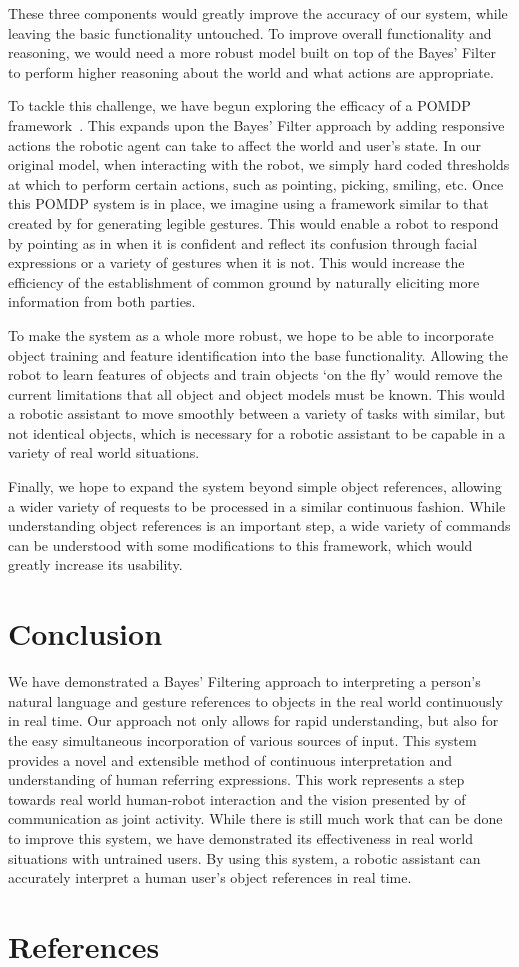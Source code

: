 \documentclass[a4paper, 11pt]{article} %
\begin{document}
These three components would greatly improve the accuracy of our system, while leaving the basic functionality untouched. To improve overall functionality and reasoning, we would need a more robust model built on top of the Bayes' Filter to perform higher reasoning about the world and what actions are appropriate.

To tackle this challenge, we have begun exploring the efficacy of a POMDP framework~\citep{kaelbling99}. This expands upon the Bayes' Filter approach by adding responsive actions the robotic agent can take to affect the world and user's state. In our original model, when interacting with the robot, we simply hard coded thresholds at which to perform certain actions, such as pointing, picking, smiling, etc. Once this POMDP system is in place, we imagine using a framework similar to that created by \citet{dragan13} for generating legible gestures. This would enable a robot to respond by pointing as in \citet{holladay14} when it is confident and reflect its confusion through facial expressions or a variety of gestures when it is not. This would increase the efficiency of the establishment of common ground by naturally eliciting more information from both parties.

To make the system as a whole more robust, we hope to be able to incorporate object training and feature identification into the base functionality. Allowing the robot to learn features of objects and train objects `on the fly' would remove the current limitations that all object and object models must be known. This would a robotic assistant to move smoothly between a variety of tasks with similar, but not identical objects, which is necessary for a robotic assistant to be capable in a variety of real world situations.

Finally, we hope to expand the system beyond simple object references, allowing a wider variety of requests to be processed in a similar continuous fashion. While understanding object references is an important step, a wide variety of commands can be understood with some modifications to this framework, which would greatly increase its usability.
\section{Conclusion}
We have demonstrated a Bayes' Filtering approach to interpreting a person's natural language and gesture references to objects in the real world continuously in real time. Our approach not only allows for rapid understanding, but also for the easy simultaneous incorporation of various sources of input. This system provides a novel and extensible method of continuous interpretation and understanding of human referring expressions. This work represents a step towards real world human-robot interaction and the vision presented by \citet{clark96} of communication as joint activity. While there is still much work that can be done to improve this system, we have demonstrated its effectiveness in real world situations with untrained users. By using this system, a robotic assistant can accurately interpret a human user's object references in real time.
\newpage
{}
\section*{\centering References}


\end{document}
